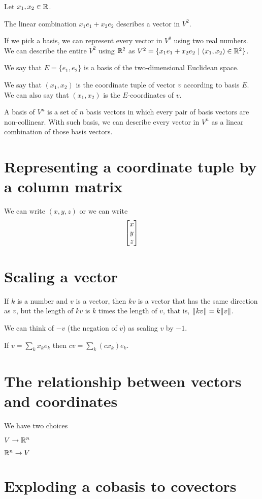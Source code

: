 Let \(x_1,x_2\in\mathbb{R}\).

The linear combination \(x_1 e_1 + x_2 e_2\) describes a vector in \(V^2\).

If we pick a basis,
we can represent every vector in \(V^2\) using two real numbers.
We can describe the entire \(V^2\) using \(\mathbb{R}^2\)
as \( V^2 = \{ x_1 e_1 + x_2 e_2 ~|~ (x_1,x_2) \in \mathbb{R}^2 \} \).

We say that \(E = \{e_1,e_2\}\) is a basis of the two-dimensional Euclidean space.

We say that \((x_1,x_2)\) is the coordinate tuple of vector \(v\) according to basis \(E\).
We can also say that \((x_1,x_2)\) is the \(E\)-coordinates of \(v\).

A basis of \(V^n\) is a set of \(n\) basis vectors
in which every pair of basis vectors are non-collinear.
With such basis, we can describe every vector in \(V^n\)
as a linear combination of those basis vectors.

\section{Representing a coordinate tuple by a column matrix}

We can write \((x,y,z)\) or we can write
\[
    \begin{bmatrix}x \\ y \\ z\end{bmatrix}
\]

\section{Scaling a vector}

If \(k\) is a number and \(v\) is a vector,
then \(kv\) is a vector that has the same direction as \(v\),
but the length of \(kv\) is \(k\) times the length of \(v\),
that is, \( \norm{k v} = k \norm{v} \).

We can think of \(-v\) (the negation of \(v\)) as scaling \(v\) by \(-1\).

If \(v = \sum_k x_k e_k\) then \(cv = \sum_k (c x_k) e_k \).

\section{The relationship between vectors and coordinates}

We have two choices

\(V \to \mathbb{R}^n\)

\(\mathbb{R}^n \to V\)

\section{Exploding a cobasis to covectors}

